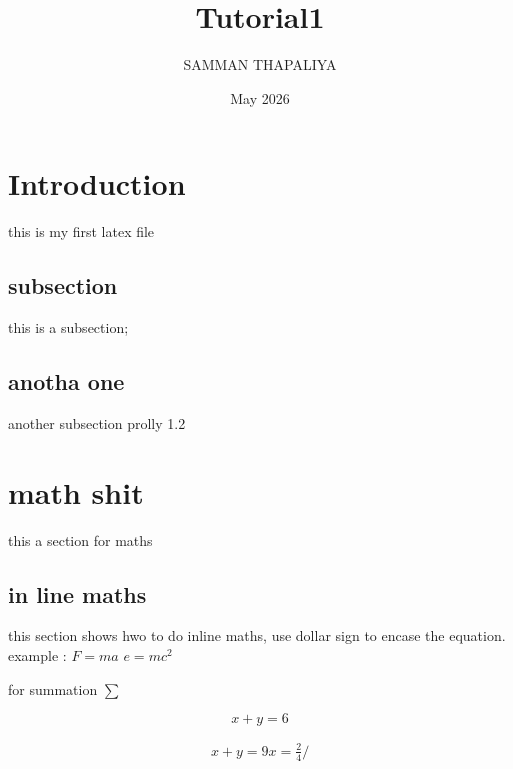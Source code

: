 \documentclass{article}
\title{Tutorial1}
\author{SAMMAN THAPALIYA}
\date{May 2026}
\begin{document}
\maketitle

\section{Introduction}
this is my first latex file
\subsection{subsection}
this is a subsection;
\subsection{anotha one}
another subsection prolly 1.2

\section{math shit}
this a section for maths
\subsection{in line maths}
this section shows hwo to do inline maths, use dollar sign to encase the equation.
example : $F = ma$ $e=mc^2$

for summation $\sum$

\begin{equation}
    x + y = 6
\end{equation}

\begin{equation}\label{eq1}
\begin{split}

x+y =9
x = \frac{2}{4} /

\end{split}
    
\end{equation}
\end{document}

